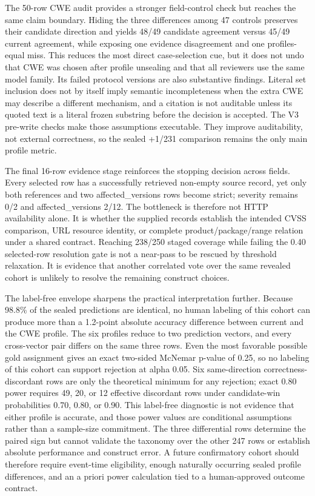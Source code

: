The 50-row CWE audit provides a stronger field-control check but reaches the same claim boundary. Hiding the three differences among 47 controls preserves their candidate direction and yields 48/49 candidate agreement versus 45/49 current agreement, while exposing one evidence disagreement and one profiles-equal miss. This reduces the most direct case-selection cue, but it does not undo that CWE was chosen after profile unsealing and that all reviewers use the same model family. Its failed protocol versions are also substantive findings. Literal set inclusion does not by itself imply semantic incompleteness when the extra CWE may describe a different mechanism, and a citation is not auditable unless its quoted text is a literal frozen substring before the decision is accepted. The V3 pre-write checks make those assumptions executable. They improve auditability, not external correctness, so the sealed +1/231 comparison remains the only main profile metric.

The final 16-row evidence stage reinforces the stopping decision across fields. Every selected row has a successfully retrieved non-empty source record, yet only both references and two affected\_versions rows become strict; severity remains 0/2 and affected\_versions 2/12. The bottleneck is therefore not HTTP availability alone. It is whether the supplied records establish the intended CVSS comparison, URL resource identity, or complete product/package/range relation under a shared contract. Reaching 238/250 staged coverage while failing the 0.40 selected-row resolution gate is not a near-pass to be rescued by threshold relaxation. It is evidence that another correlated vote over the same revealed cohort is unlikely to resolve the remaining construct choices.

The label-free envelope sharpens the practical interpretation further. Because 98.8\% of the sealed predictions are identical, no human labeling of this cohort can produce more than a 1.2-point absolute accuracy difference between current and the CWE profile. The six profiles reduce to two prediction vectors, and every cross-vector pair differs on the same three rows. Even the most favorable possible gold assignment gives an exact two-sided McNemar p-value of 0.25, so no labeling of this cohort can support rejection at alpha 0.05. Six same-direction correctness-discordant rows are only the theoretical minimum for any rejection; exact 0.80 power requires 49, 20, or 12 effective discordant rows under candidate-win probabilities 0.70, 0.80, or 0.90. This label-free diagnostic is not evidence that either profile is accurate, and those power values are conditional assumptions rather than a sample-size commitment. The three differential rows determine the paired sign but cannot validate the taxonomy over the other 247 rows or establish absolute performance and construct error. A future confirmatory cohort should therefore require event-time eligibility, enough naturally occurring sealed profile differences, and an a priori power calculation tied to a human-approved outcome contract.

